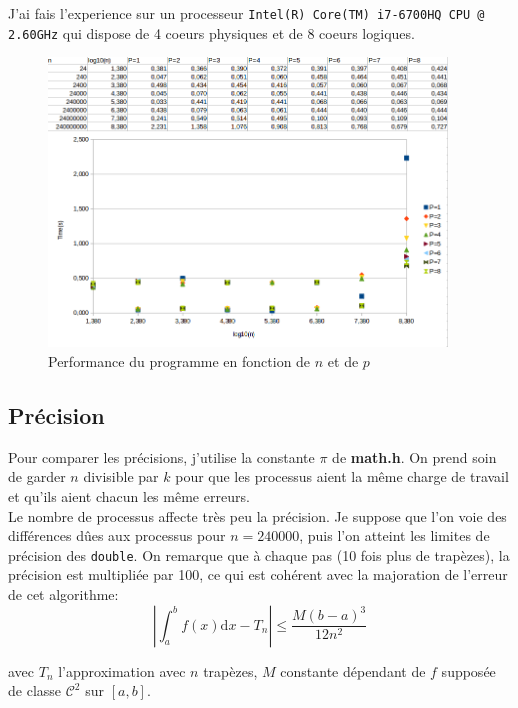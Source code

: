 \documentclass{article}
\begin{document}
J'ai fais l'experience sur un processeur \texttt{Intel(R) Core(TM) i7-6700HQ CPU @ 2.60GHz} qui dispose de 4 coeurs physiques et de 8 coeurs logiques. 

\begin{figure}[h]
    \centering
    \includegraphics[width=300pt]{perf_pi.png}
    \caption{Performance du programme en fonction de $n$ et de $p$}
\end{figure}

\subsection{Précision}

Pour comparer les précisions, j'utilise la constante $\pi$ de \textbf{math.h}.
On prend soin de garder $n$ divisible par $k$ pour que les processus aient la même charge de travail et qu'ils aient chacun les même erreurs.\\

Le nombre de processus affecte très peu la précision. Je suppose que l'on voie des différences dûes aux processus pour $n=240000$, puis l'on atteint les limites de précision des \lstinline[style=ccode]|double|. On remarque que à chaque pas (10 fois plus de trapèzes), la précision est multipliée par 100, ce qui est cohérent avec la majoration de l'erreur de cet algorithme:\\

\[
\left|\int_{a}^{b}f(x)\mathrm{d}x -T_n \right| \leq \dfrac{M(b-a)^3}{12n^2}
\]

avec $T_n$ l'approximation avec $n$ trapèzes, $M$ constante dépendant de $f$ supposée de classe $\mathcal{C}^2$ sur $[a,b]$.
\end{document}
